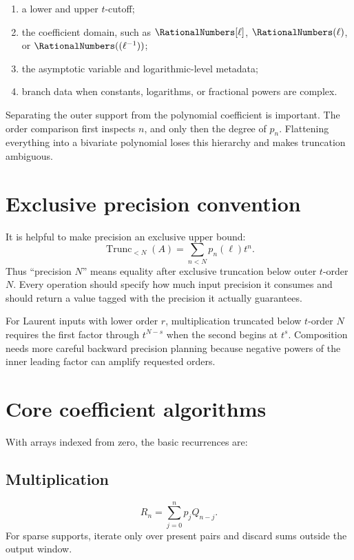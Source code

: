\documentclass[11pt,oneside,openany]{book}
\newcommand{\TransseriesTruncateBelow}[2]{%
  \operatorname{Trunc}_{<#2}\!\left(#1\right)%
}
\begin{document}
\begin{enumerate}
\item a lower and upper \(t\)-cutoff;
\item the coefficient domain, such as \(\RationalNumbers[\ell]\),
\(\RationalNumbers(\ell)\), or \(\RationalNumbers((\ell^{-1}))\);
\item the asymptotic variable and logarithmic-level metadata;
\item branch data when constants, logarithms, or fractional powers are complex.
\end{enumerate}

Separating the outer support from the polynomial coefficient is important.
The order comparison first inspects \(n\), and only then the degree of
\(p_n\).  Flattening everything into a bivariate polynomial loses this
hierarchy and makes truncation ambiguous.

\section{Exclusive precision convention}
It is helpful to make precision an exclusive upper bound:
\begin{equation}\label{eq:exclusiveprecision}
 \TransseriesTruncateBelow{A}{N}=\sum_{n<N}p_n(\ell)t^n.
\end{equation}
Thus ``precision \(N\)'' means equality after exclusive truncation below
outer \(t\)-order \(N\).  Every operation should
specify how much input precision it consumes and should return a value tagged
with the precision it actually guarantees.

For Laurent inputs with lower order \(r\), multiplication truncated below
\(t\)-order \(N\)
requires the first factor through \(t^{N-s}\) when the second begins at
\(t^s\).  Composition needs more careful backward precision planning because
negative powers of the inner leading factor can amplify requested orders.

\section{Core coefficient algorithms}
With arrays indexed from zero, the basic recurrences are:

\subsection{Multiplication}
\begin{equation}\label{eq:algmulcoeff}
 R_n=\sum_{j=0}^{n}p_jQ_{n-j}.
\end{equation}
For sparse supports, iterate only over present pairs and discard sums outside
the output window.
\end{document}
